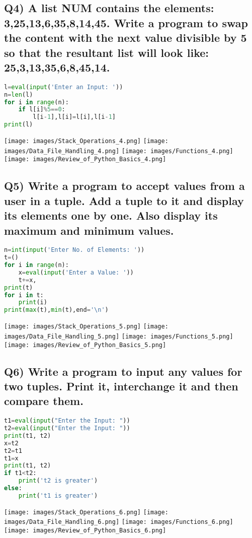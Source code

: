 \documentclass{article}
\begin{document}
\subsection*{Q4) A list NUM contains the elements: 3,25,13,6,35,8,14,45. Write a program to swap the content with the next value divisible by 5 so that the resultant list will look like: 25,3,13,35,6,8,45,14.}
\begin{lstlisting}[language=Python]
l=eval(input('Enter an Input: '))
n=len(l)
for i in range(n):
    if l[i]%5==0:
        l[i-1],l[i]=l[i],l[i-1]
print(l)
\end{lstlisting}
\texttt{[image: images/Stack\_Operations\_4.png]}
\texttt{[image: images/Data\_File\_Handling\_4.png]}
\texttt{[image: images/Functions\_4.png]}
\texttt{[image: images/Review\_of\_Python\_Basics\_4.png]}

\subsection*{Q5) Write a program to accept values from a user in a tuple. Add a tuple to it and display its elements one by one. Also display its maximum and minimum values.}
\begin{lstlisting}[language=Python]
n=int(input('Enter No. of Elements: '))
t=()
for i in range(n):
    x=eval(input('Enter a Value: '))
    t+=x,
print(t)
for i in t:
    print(i)
print(max(t),min(t),end='\n')
\end{lstlisting}
\texttt{[image: images/Stack\_Operations\_5.png]}
\texttt{[image: images/Data\_File\_Handling\_5.png]}
\texttt{[image: images/Functions\_5.png]}
\texttt{[image: images/Review\_of\_Python\_Basics\_5.png]}

\subsection*{Q6) Write a program to input any values for two tuples. Print it, interchange it and then compare them.}
\begin{lstlisting}[language=Python]
t1=eval(input("Enter the Input: "))
t2=eval(input("Enter the Input: "))
print(t1, t2)
x=t2
t2=t1
t1=x
print(t1, t2)
if t1<t2:
    print('t2 is greater')
else:
    print('t1 is greater')
\end{lstlisting}
\texttt{[image: images/Stack\_Operations\_6.png]}
\texttt{[image: images/Data\_File\_Handling\_6.png]}
\texttt{[image: images/Functions\_6.png]}
\texttt{[image: images/Review\_of\_Python\_Basics\_6.png]}
\end{document}
